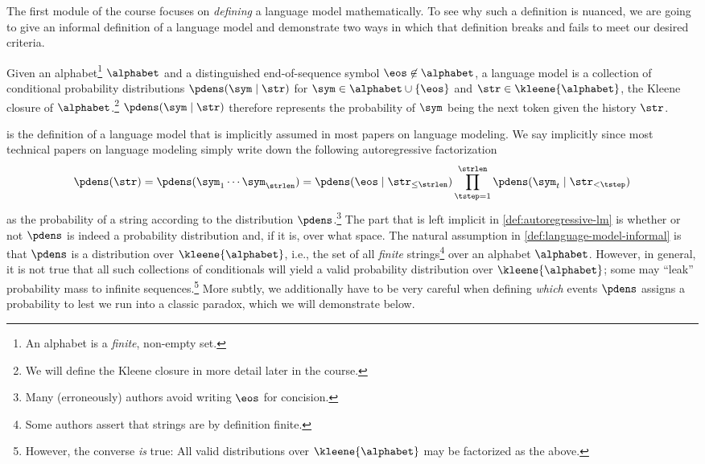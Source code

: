 The first module of the course focuses on \emph{defining} a language model mathematically.
To see why such a definition is nuanced, we are going to give an informal definition of a language model and demonstrate two ways in which that definition breaks and fails to meet our desired criteria.
\begin{definition}[Informal]\label{def:language-model-informal}
Given an alphabet\footnote{An alphabet is a \emph{finite}, non-empty set.} $\alphabet$ and a distinguished end-of-sequence symbol $\eos \not\in \alphabet$, a language model is a collection of conditional probability distributions $\pdens(\sym \mid \str)$ for $\sym \in \alphabet \cup \{\eos\}$ and $\str \in \kleene{\alphabet}$, the Kleene closure of $\alphabet$.\footnote{We will define the Kleene closure in more detail later in the course.}
$\pdens(\sym \mid \str)$ therefore represents the probability of $\sym$ being the next token given the history $\str$.
\end{definition}
 is the definition of a language model that is implicitly assumed in most papers on language modeling.
We say implicitly since most technical papers on language modeling simply write down the following autoregressive factorization
\begin{equation}\label{def:autoregressive-lm}
    \pdens(\str) = \pdens(\sym_1\cdots \sym_\strlen) = \pdens(\eos \mid \str_{\leq \strlen}) \prod_{\tstep=1}^\strlen \pdens(\sym_t \mid \str_{<\tstep})
\end{equation}
as the probability of a string according to the distribution $\pdens$.\footnote{Many (erroneously) authors avoid writing $\eos$ for concision.}
The part that is left implicit in \cref{def:autoregressive-lm} is whether or not $\pdens$ is indeed a probability distribution and, if it is, over what space.
The natural assumption in \cref{def:language-model-informal} is that $\pdens$ is a distribution over $\kleene{\alphabet}$, i.e., the set of all \emph{finite} strings\footnote{Some authors assert that strings are by definition finite.} over an alphabet $\alphabet$.
However, in general, it is not true that all such collections of conditionals will yield a valid probability distribution over $\kleene{\alphabet}$; some may ``leak'' probability mass to infinite sequences.\footnote{However, the converse \emph{is} true: All valid distributions over $\kleene{\alphabet}$ may be factorized as the above.}
More subtly, we additionally have to be very careful when defining \emph{which} events $\pdens$ assigns a probability to lest we run into a classic paradox, which we will demonstrate below.

